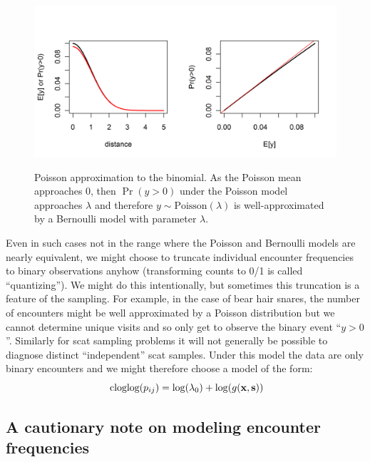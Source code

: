 \begin{figure}
\centering
\includegraphics[width=5in,height=2.5in]{Ch5-PoisMn/figs/Poisson-Bern.png}
\caption{Poisson approximation to the binomial. As the Poisson mean
  approaches 0, then $\Pr(y>0)$ under the Poisson model approaches
  $\lambda$ and therefore $y \sim \mbox{Poisson}(\lambda)$ is well-approximated by a
  Bernoulli model with parameter $\lambda$.
}
\label{poisson-mn.fig.poissonbern}
\end{figure}

Even in such cases not in the range where the Poisson and
Bernoulli models are nearly equivalent, we might choose to truncate
individual encounter frequencies to binary observations anyhow
(transforming counts to 0/1 is called ``quantizing'').  We might do this intentionally, but sometimes this
truncation is a feature of the sampling. For example, in the case of
bear hair snares, the number of encounters might be well approximated
by a Poisson distribution but we cannot determine unique visits and so
only get to observe the binary event ``$y>0$''. Similarly for scat
sampling problems it will not generally be possible to diagnose
distinct ``independent'' scat samples. Under this model the data are
only binary encounters and we might therefore choose a model of the
form:
\[
\mbox{ cloglog}(p_{ij}) = \log(\lambda_{0})  + \log(g({\bf x},{\bf s}))
\]

\subsection{A cautionary note on modeling encounter frequencies}

